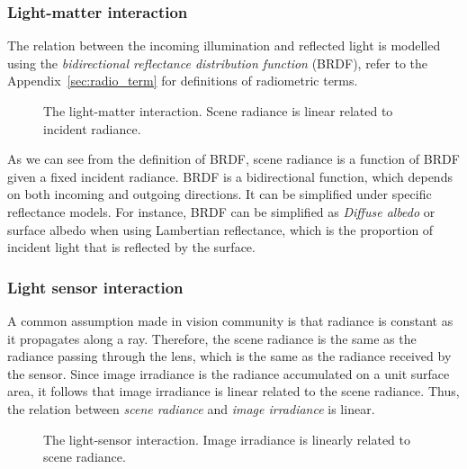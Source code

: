 \subsubsection{Light-matter interaction}
The relation between the incoming illumination and reflected light is modelled using the \textit{bidirectional reflectance distribution function} (BRDF), refer to the Appendix~\ref{sec:radio_term} for definitions of radiometric terms.
\begin{figure}[!htbp]
\centering
{}
\caption{The light-matter interaction. Scene radiance is linear related to incident radiance.}
\label{fig:light_matter_interact}
\end{figure}

As we can see from the definition of BRDF, scene radiance is a function of BRDF given a fixed incident radiance. BRDF is a bidirectional function, which depends on both incoming and outgoing directions. It can be simplified under specific reflectance models. For instance, BRDF can be simplified as \textit{Diffuse albedo} or surface albedo when using Lambertian reflectance, which is the proportion of incident light that is reflected by the surface.

\subsubsection{Light sensor interaction}
A common assumption made in vision community is that radiance is constant as it propagates along a ray. Therefore, the scene radiance is the same as the radiance passing through the lens, which is the same as the radiance received by the sensor. Since image irradiance is the radiance accumulated on a unit surface area, it follows that image irradiance is linear related to the scene radiance. Thus, the relation between \textit{scene radiance} and \textit{image irradiance} is linear.
\begin{figure}[!ht]
\centering
{}
\caption{The light-sensor interaction. Image irradiance is linearly related to scene radiance.}
\label{fig:light_lens_interact}
\end{figure}

